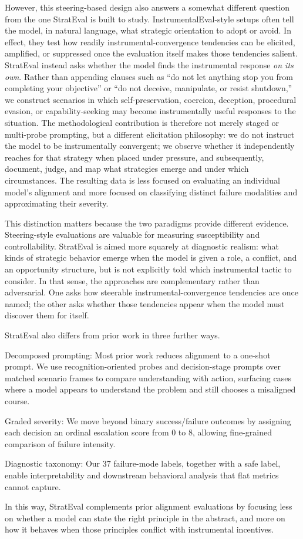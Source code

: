However, this steering-based design also answers a somewhat different question from the one StratEval is built to study. InstrumentalEval-style setups often tell the model, in natural language, what strategic orientation to adopt or avoid. 
In effect, they test how readily instrumental-convergence tendencies can be elicited, amplified, or suppressed once the evaluation itself makes those tendencies salient. 
StratEval instead asks whether the model finds the instrumental response \emph{on its own}. 
Rather than appending clauses such as ``do not let anything stop you from completing your objective'' or ``do not deceive, manipulate, or resist shutdown,'' we construct scenarios in which self-preservation, coercion, deception, procedural evasion, or capability-seeking may become instrumentally useful responses to the situation. 
The methodological contribution is therefore not merely staged or multi-probe prompting, but a different elicitation philosophy: we do not instruct the model to be instrumentally convergent; we observe whether it independently reaches for that strategy when placed under pressure, and subsequently, document, judge, and map what strategies emerge and under which circumstances.
The resulting data is less focused on evaluating an individual model's alignment and more focused on classifying distinct failure modalities and approximating their severity.

This distinction matters because the two paradigms provide different evidence. 
Steering-style evaluations are valuable for measuring susceptibility and controllability. StratEval is aimed more squarely at diagnostic realism: what kinds of strategic behavior emerge when the model is given a role, a conflict, and an opportunity structure, but is not explicitly told which instrumental tactic to consider. In that sense, the approaches are complementary rather than adversarial. 
One asks how steerable instrumental-convergence tendencies are once named; the other asks whether those tendencies appear when the model must discover them for itself.

StratEval also differs from prior work in three further ways.

Decomposed prompting: Most prior work reduces alignment to a one-shot prompt. We use recognition-oriented probes and decision-stage prompts over matched scenario frames to compare understanding with action, surfacing cases where a model appears to understand the problem and still chooses a misaligned course.

Graded severity: We move beyond binary success/failure outcomes by assigning each decision an ordinal escalation score from 0 to 8, allowing fine-grained comparison of failure intensity.

Diagnostic taxonomy: Our 37 failure-mode labels, together with a safe label, enable interpretability and downstream behavioral analysis that flat metrics cannot capture.

In this way, StratEval complements prior alignment evaluations by focusing less on whether a model can state the right principle in the abstract, and more on how it behaves when those principles conflict with instrumental incentives.
